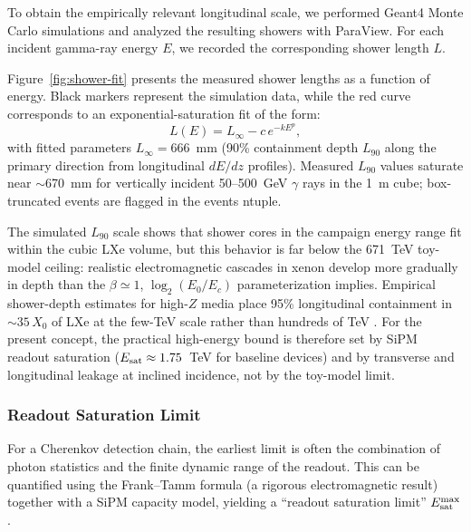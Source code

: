 \documentclass{aastex701}
\begin{document}
To obtain the empirically relevant longitudinal scale, we performed Geant4 Monte Carlo simulations and analyzed the resulting showers with ParaView. For each incident gamma-ray energy $E$, we recorded the corresponding shower length $L$.

Figure~\ref{fig:shower-fit} presents the measured shower lengths as a function of energy. Black markers represent the simulation data, while the red curve corresponds to an exponential-saturation fit of the form:  
\begin{equation}
L(E) = L_\infty - c \, e^{-k E^p},
\end{equation}
with fitted parameters $L_\infty = 666$~mm (90\% containment depth $L_{90}$ along the primary direction from longitudinal $dE/dz$ profiles). Measured $L_{90}$ values saturate near $\sim$670~mm for vertically incident 50--500~GeV $\gamma$ rays in the 1~m cube; box-truncated events are flagged in the events ntuple.

The simulated $L_{90}$ scale shows that shower cores in the campaign energy range fit within the cubic LXe volume, but this behavior is far below the 671~TeV toy-model ceiling: realistic electromagnetic cascades in xenon develop more gradually in depth than the $\beta\simeq 1$, $\log_2(E_0/E_c)$ parameterization implies. Empirical shower-depth estimates for high-$Z$ media place 95\% longitudinal containment in $\sim 35\,X_0$ of LXe at the few-TeV scale rather than hundreds of TeV \cite{Workman:481642}. For the present concept, the practical high-energy bound is therefore set by SiPM readout saturation ($E_{\rm sat}\approx 1.75$~TeV for baseline devices) and by transverse and longitudinal leakage at inclined incidence, not by the toy-model limit.

\subsubsection{Readout Saturation Limit}

For a Cherenkov detection chain, the earliest limit is often the combination of photon statistics and the finite dynamic range of the readout. This can be quantified using the Frank--Tamm formula (a rigorous electromagnetic result) together with a SiPM capacity model, yielding a ``readout saturation limit'' $E_{\rm sat}^{\max}$.
\end{document}
